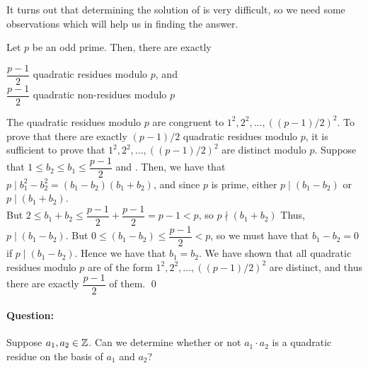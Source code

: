 \documentclass[../main.tex]{subfiles}
\begin{document}
It turns out that determining the solution of  is very difficult, so we need some observations which will help us in finding the answer.

\begin{prop}
    Let $p$ be an odd prime. Then, there are exactly
    \begin{center}
        $\dfrac{p-1}{2}$ quadratic residues modulo $p$, and \\
        $\dfrac{p-1}{2}$ quadratic non-residues modulo $p$
    \end{center}
\end{prop}
\begin{pf}
    The quadratic residues modulo $p$ are congruent to $1^2,2^2,...,((p-1)/2)^2$. To prove that there are exactly $(p-1)/2$ quadratic residues modulo $p$, it is sufficient to prove that $1^2,2^2,...,((p-1)/2)^2$ are distinct modulo $p$. \sspace
    Suppose that $1 \leq b_2 \leq b_1 \leq \dfrac{p-1}{2}$ and . Then, we have that $p \mid b_1^2 - b_2^2 = (b_1-b_2)(b_1+b_2)$, and since $p$ is prime, either $p \mid (b_1-b_2)$ or $p \mid (b_1+b_2)$. \\
    But $2 \leq b_1+b_2 \leq \dfrac{p-1}{2}+\dfrac{p-1}{2}=p-1<p$, so $p \nmid (b_1+b_2)$ \sspace
    Thus, $p \mid (b_1-b_2)$. But $0 \leq (b_1-b_2) \leq \dfrac{p-1}{2} < p$, so we must have that $b_1-b_2=0$ if $p \mid (b_1-b_2).$ Hence we have that $b_1=b_2$. \sspace
    We have shown that all quadratic residues modulo $p$ are of the form $1^2,2^2,...,((p-1)/2)^2$ are distinct, and thus there are exactly $\dfrac{p-1}{2}$ of them. \qed
\end{pf}

\paragraph{Question:} Suppose $a_1,a_2 \in \mathbb{Z}$. Can we determine whether or not $a_1 \cdot a_2$ is a quadratic residue on the basis of $a_1$ and $a_2$?
\end{document}
